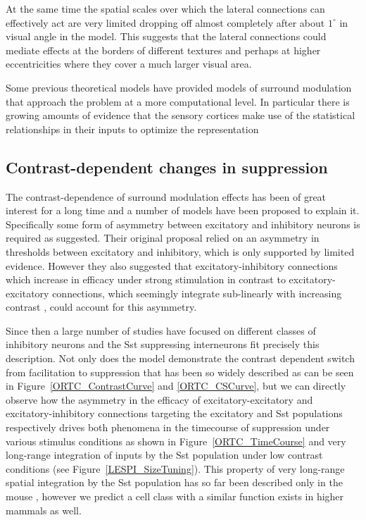At the same time the spatial scales over which the lateral connections
can effectively act are very limited dropping off almost completely
after about $1^\circ$ in visual angle in the model. This suggests that
the lateral connections could mediate effects at the borders of
different textures and perhaps at higher eccentricities where they
cover a much larger visual area.

Some previous theoretical models have provided models of surround
modulation that approach the problem at a more computational level. In
particular there is growing amounts of evidence that the sensory
cortices make use of the statistical relationships in their inputs to
optimize the representation

\subsection{Contrast-dependent changes in suppression}

The contrast-dependence of surround modulation effects has been of
great interest for a long time and a number of models have been
proposed to explain it. Specifically some form of asymmetry between
excitatory and inhibitory neurons is required as \cite{Somers1998}
suggested. Their original proposal relied on an asymmetry in
thresholds between excitatory and inhibitory, which is only supported
by limited evidence. However they also suggested that
excitatory-inhibitory connections which increase in efficacy under
strong stimulation in contrast to excitatory-excitatory connections,
which seemingly integrate sub-linearly with increasing contrast
\citep{Abbott1997, Tsodyks1997}, could account for this asymmetry.

Since then a large number of studies have focused on different classes
of inhibitory neurons and the Sst suppressing interneurons fit
precisely this description. Not only does the model demonstrate the
contrast dependent switch from facilitation to suppression that has
been so widely described \citep{Levitt1997, Polat1998, Dragoi2000,
  Wang2009} as can be seen in Figure~\ref{ORTC_ContrastCurve} and
\ref{ORTC_CSCurve}, but we can directly observe how the asymmetry in
the efficacy of excitatory-excitatory and excitatory-inhibitory
connections targeting the excitatory and Sst populations respectively
drives both phenomena in the timecourse of suppression under various
stimulus conditions as shown in Figure~\ref{ORTC_TimeCourse} and very
long-range integration of inputs by the Sst population under low
contrast conditions (see Figure~\ref{LESPI_SizeTuning}). This property
of very long-range spatial integration by the Sst population has so
far been described only in the mouse \citep{Adesnik2012}, however we
predict a cell class with a similar function exists in higher mammals
as well.


